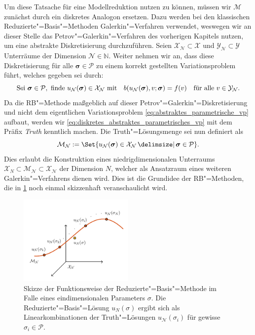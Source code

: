 \documentclass[../main.tex]{subfiles}
\begin{document}
Um diese Tatsache für eine Modellreduktion nutzen zu können, müssen wir $\mathcal M$ zunächst durch ein diskretes Analogon ersetzen.
Dazu werden bei den klassischen Reduzierte"=Basis"=Methoden Galerkin"=Verfahren verwendet, weswegen wir an dieser Stelle das Petrov"=Galerkin"=Verfahren des vorherigen Kapitels nutzen, um eine abstrakte Diskretisierung durchzuführen.
Seien $\mathcal X_{\mathcal N} \subset \mathcal X$ und $\mathcal Y_{\mathcal N} \subset \mathcal Y$ Unterräume der Dimension $\mathcal N \in \mathbb{N}$.
Weiter nehmen wir an, dass diese Diskretisierung für alle $\bm \sigma \in \mathcal P$ zu einem korrekt gestellten Variationsproblem führt, welches gegeben sei durch:
\begin{equation}
\label{eq:diskretes_abstraktes_parametrisches_vp}
    \text{Sei } \bm \sigma \in \mathcal P, \text{ finde } u_{\mathcal N}(\bm \sigma) \in \mathcal X_{\mathcal N} \text{ mit} \quad b(u_{\mathcal N}(\bm \sigma), v; \bm \sigma) = f(v) \quad \fa v \in \mathcal Y_{\mathcal N}.
\end{equation}
Da die RB"=Methode maßgeblich auf dieser Petrov"=Galerkin"=Diskretisierung und nicht dem eigentlichen Variationsproblem \cref{eq:abstraktes_parametrische_vp} aufbaut, werden wir \cref{eq:diskretes_abstraktes_parametrisches_vp} mit dem Präfix \emph{Truth} kenntlich machen.
Die Truth"=Lösungsmenge sei nun definiert als
\begin{equation}
\label{eq:truth_loesungsmenge}
    \mathcal M_{\mathcal N} := \Set{u_{\mathcal N}(\bm \sigma) \in \mathcal X_{\mathcal N} \given \bm \sigma \in \mathcal P}.
\end{equation}
Dies erlaubt die Konstruktion eines niedrigdimensionalen Unterraums $\mathcal X_{N} \subset \mathcal M_{\mathcal N} \subset \mathcal X_{\mathcal N}$ der Dimension $N$, welcher als Ansatzraum eines weiteren Galerkin"=Verfahrens dienen wird.
Dies ist die Grundidee der RB"=Methoden, die in \cref{figure:rbm_loesungsmenge} noch einmal skizzenhaft veranschaulicht wird.

\begin{figure}
    \centering
    \includegraphics[width=0.5\textwidth]{figures/chapter5/rb.pdf}
    \caption[%
    Skizze zur Motivation der Reduzierte"=Basis"=Methode.
    ]{
        Skizze der Funktionsweise der Reduzierte"=Basis"=Methode im Falle eines eindimensionalen Parameters $\sigma$.
        Die Reduzierte"=Basis"=Lösung $u_{N}(\sigma)$ ergibt sich als Linearkombinationen der Truth"=Lösungen $u_{\mathcal N}(\sigma_{i})$ für gewisse $\sigma_{i} \in \mathcal P$.
        }
    \label{figure:rbm_loesungsmenge}
\end{figure}
\end{document}
